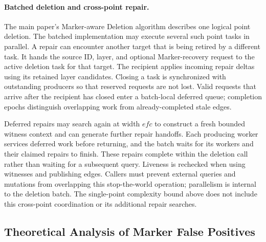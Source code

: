 \paragraph{Batched deletion and cross-point repair.}
The main paper's Marker-aware Deletion algorithm describes one logical point
deletion. The batched implementation may execute several such point tasks in
parallel.
A repair can encounter another target that is being retired by a different
task. It hands the source ID, layer, and optional Marker-recovery request to the
active deletion task for that target.
The recipient applies incoming repair deltas using its retained layer
candidates. Closing a task is synchronized with outstanding producers so that
reserved requests are not lost.
Valid requests that arrive after the recipient has closed enter a batch-local
deferred queue; completion epochs distinguish overlapping work from
already-completed stale edges.

Deferred repairs may search again at width $efc$ to construct a fresh bounded
witness context and can generate further repair handoffs.
Each producing worker services deferred work before returning, and the batch
waits for its workers and their claimed repairs to finish.
These repairs complete within the deletion call rather than waiting for a
subsequent query.
Liveness is rechecked when using witnesses and publishing edges.
Callers must prevent external queries and mutations from overlapping this
stop-the-world operation; parallelism is internal to the deletion batch.
The single-point complexity bound above does not include this cross-point
coordination or its additional repair searches.

\subsection{Theoretical Analysis of Marker False Positives}


